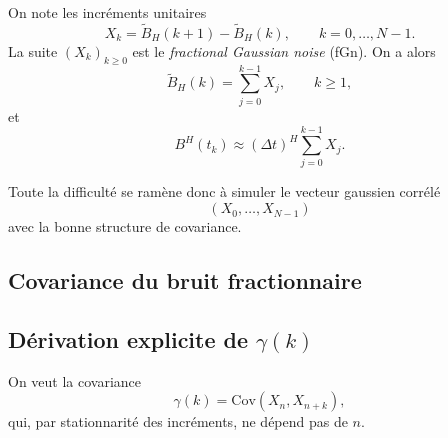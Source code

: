 \documentclass[11pt,a4paper]{article}
\newcommand{\Cov}{\mathrm{Cov}}
\newcommand{\1}{\mathbf{1}}
\newcommand{\bH}{B^{H}}
\begin{document}
On note les incréments unitaires
\begin{equation}
  X_k = \widetilde B_H(k+1) - \widetilde B_H(k),\qquad k=0,\dots,N-1.
\end{equation}
La suite $(X_k)_{k\ge 0}$ est le \emph{fractional Gaussian noise} (fGn).
On a alors
\begin{equation}
  \widetilde B_H(k)
  = \sum_{j=0}^{k-1} X_j,\qquad k\ge 1,
\end{equation}
et
\begin{equation}
  \bH(t_k)
  \approx (\Delta t)^H \sum_{j=0}^{k-1} X_j.
\end{equation}

Toute la difficulté se ramène donc à simuler le vecteur gaussien corrélé
\[
  (X_0,\dots,X_{N-1})
\]
avec la bonne structure de covariance.

\subsection{Covariance du bruit fractionnaire}

\subsection{Dérivation explicite de $\gamma(k)$}

On veut la covariance
\begin{equation}
  \gamma(k)
  = \Cov(X_n,X_{n+k}),
\end{equation}
qui, par stationnarité des incréments, ne dépend pas de $n$.
\end{document}
